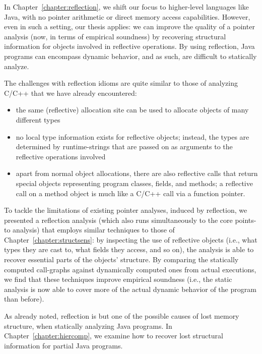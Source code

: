 In Chapter~\ref{chapter:reflection}, we shift our focus to
higher-level languages like Java, with no pointer arithmetic or direct
memory access capabilities. However, even in such a setting, our thesis
applies: we can improve the quality of a pointer analysis (now, in
terms of empirical soundness) by recovering structural information for
objects involved in reflective operations. By using reflection, Java
programs can encompass dynamic behavior, and as such, are difficult to
statically analyze.

The challenges with reflection idioms are quite similar to those of
analyzing C/C++ that we have already encountered:
\begin{itemize}[\(\cdot\)]
\item the same (reflective) allocation site can be used to allocate
  objects of many different types
\item no local type information exists for reflective objects;
  instead, the types are determined by runtime-strings that are passed
  on as arguments to the reflective operations involved
\item apart from normal object allocations, there are also reflective
  calls that return special objects representing program classes,
  fields, and methods; a reflective call on a method object is much
  like a C/C++ call via a function pointer.
\end{itemize}

To tackle the limitations of existing pointer analyses, induced by
reflection, we presented a reflection analysis (which also runs
simultaneously to the core points-to analysis) that employs similar
techniques to those of Chapter~\ref{chapter:structsens}: by inspecting
the use of reflective objects (i.e., what types they are cast to, what
fields they access, and so on), the analysis is able to recover
essential parts of the objects' structure.
%
By comparing the statically computed call-graphs against dynamically
computed ones from actual executions, we find that these techniques
improve empirical soundness (i.e., the static analysis is now able to
cover more of the actual dynamic behavior of the program than
before).

As already noted, reflection is but one of the possible causes of lost
memory structure, when statically analyzing Java programs. In
Chapter~\ref{chapter:hiercomp}, we examine how to recover lost
structural information for partial Java programs.

